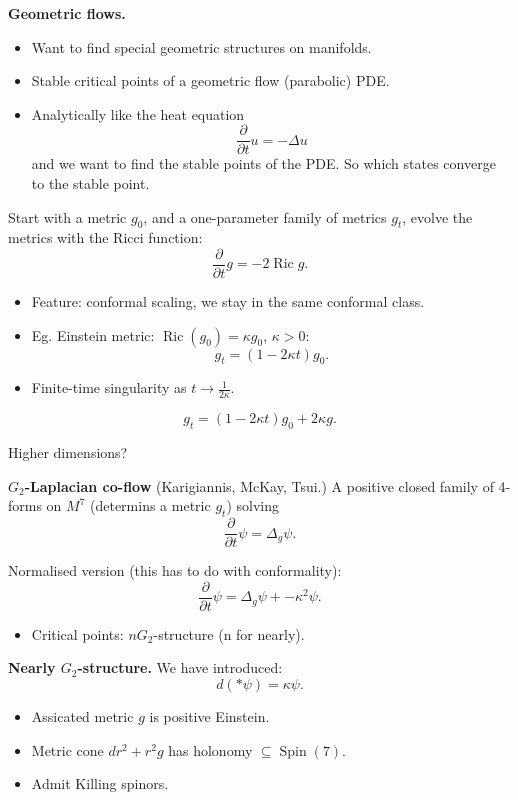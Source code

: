 \medskip\noindent
{\bf Geometric flows.}
\begin{itemize}
\item Want to find special geometric
structures on manifolds.

\item Stable critical points of a geometric
flow (parabolic) PDE.

\item Analytically like the heat equation
$$
\frac{\partial }{\partial t}u=-\Delta u
$$
and we want to find the stable points of the
PDE. So which states converge to the stable
point.
\end{itemize}

\begin{example}
\label{example-ricci-flow}
Start with a metric $g_0$,
and a one-parameter family of metrics $g_t$,
 evolve the metrics with
the Ricci function:
$$
\frac{\partial }{\partial
t}g=-2\operatorname{Ric}g.
$$

\begin{itemize}
\item Feature: conformal scaling, we stay in
the same conformal class.
\item Eg. Einstein metric:
$\operatorname{Ric}(g_0)=\kappa g_0$,
$\kappa>0$:
$$
g_t= (1-2\kappa t) g_0.
$$
\item Finite-time singularity as $t \to
\frac{1}{2 \kappa}$.
\end{itemize}
\end{example}

\begin{example}
\label{example-ricci-flow-normalised}
$$
g_t= (1-2\kappa t) g_0 + 2\kappa g.
$$
\end{example}

Higher dimensions?

\medskip\noindent
{\bf $G_2$-Laplacian co-flow} (Karigiannis,
McKay, Tsui.) A positive closed family of
4-forms on $M^7$ (determins a metric $g_t$)
solving
$$
\frac{\partial }{\partial t}\psi 
= \Delta_g \psi.
$$

Normalised version (this has to do with
conformality):
$$
\frac{\partial }{\partial t}\psi 
= \Delta_g \psi+ -\kappa^2 \psi.
$$

\begin{itemize}
\item Critical points: $n G_2$-structure (n
for nearly).
\end{itemize}

\medskip\noindent
{\bf Nearly $G_2$-structure.}
We have introduced:
$$
d(* \psi)=\kappa \psi.
$$
\begin{itemize}
\item Assicated metric $g$ is positive
Einstein.
\item Metric cone $dr^2 + r^2g$ has holonomy
$\subseteq \operatorname{Spin}(7)$.
\item Admit Killing spinors.
\end{itemize}

